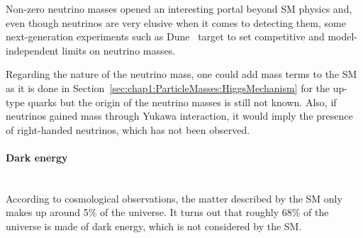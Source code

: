 
Non-zero neutrino masses opened an interesting portal beyond SM physics and, 
even though neutrinos are very elusive when it comes to detecting them, some 
next-generation experiments such as Dune~\cite{DUNE:2020lwj} target to set 
competitive and model-independent limits on neutrino masses. 

Regarding the nature of the neutrino mass, one could add mass terms to the SM as it is done in Section~\ref{sec:chap1:ParticleMasses:HiggsMechanism} 
for the up-type quarks but the origin of the neutrino masses is still not known. 
Also, if neutrinos gained mass through Yukawa interaction, it would imply the presence of right-handed neutrinos, 
which has not been observed.




\paragraph{Dark energy}\mbox{}\\
According to cosmological observations, the matter described by the SM only makes up around 5\% of the universe.
It turns out that roughly 68\% of the universe is made of dark energy, which is not considered by the SM.


